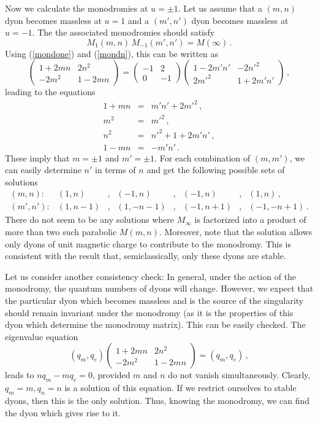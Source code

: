 Now we calculate the monodromies at $u=\pm 1$. Let us assume that a
$(m,n)$ dyon becomes massless at $u=1$ and a $(m',n')$ dyon becomes
massless at $u=-1$. The the associated monodromies should satisfy
\begin{equation}
M_1(m,n)\,M_{-1}(m',n') = M (\infty)\,.
\label{mondeq}
\end{equation}
Using (\ref{mondone}) and (\ref{mondn}), this can be written as 
$$
\left ( \begin{array}{cccc} 1 + 2mn & 2n^{2} \\ -2m^{2} & 1-2mn
\end{array} \right ) =
\left( \begin{array}{cccc} -1 & 2 \\ 0 & -1 \end{array} \right )
\left ( \begin{array}{cccc} 1-2m'n' & -2n'^{2} \\
2m'^{2} & 1 + 2m'n' \end{array} \right )\,,
$$
leading to the equations
$$
\begin{array}{rcl}
1 + mn &=& m'n' + 2m'^{2} \,,\\
m^{2} &=& m'^{2} \,,\\
n^{2} &=& n'^{2} + 1 + 2m'n'\,, \\
1 - mn &=& -m'n'\,.
\end{array}
$$
These imply that $m=\pm 1$ and $m'=\pm 1$. For each combination of
$(m,m')$, we can easily determine $n'$ in terms of $n$ and get the
following possible sets of solutions
$$
\begin{array}{cccccccc}
(m,n): &(1,n)&,&(-1, n)&,&(-1, n)&,&(1, n)\,,\\
(m',n'): &(1, n-1)&,&(1, -n-1)&,&(-1, n+1)&,&(-1, -n+1)\,. 
\end{array}
$$
There do not seem to be any solutions where $M_{\infty}$ is factorized
into a product of more than two such parabolic $M(m,n)$. Moreover,
note that the solution allows only dyons of unit magnetic charge to
contribute to the monodromy. This is  consistent with the result that,
semiclassically, only these dyons are stable. 

Let us consider another consistency check: In general, under the
action of the monodromy, the quantum numbers of dyons will
change. However, we expect that the particular dyon which becomes
massless and is the source of the singularity should remain invariant
under the monodromy (as it is the properties of this dyon which
determine the monodromy matrix). This can be easily checked. The
eigenvalue equation
\begin{equation}
(q_m, q_{e}) \left( \begin{array}{cc}
1+2mn & 2n^{2} \\ -2m^{2} & 1-2mn \end{array} \right ) =
(q_m, q_{e})\,,
\label{mon-inv}
\end{equation}
leads to $nq_m-mq_e=0$, provided $m$ and $n$ do not vanish
simultaneously. Clearly, $q_m=m, q_n=n$ is a solution of this
equation. If we restrict ourselves to stable dyons, then this is the
only solution. Thus, knowing the monodromy, we can find the dyon which
gives rise to it.   

